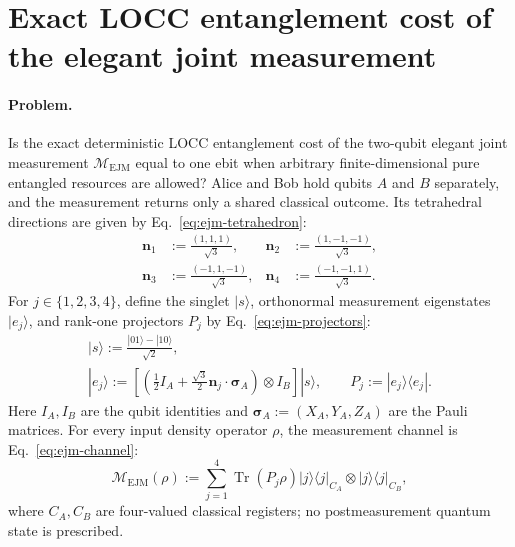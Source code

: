 \section{Exact LOCC entanglement cost of the elegant joint measurement}
\label{sec:op_d40d1f65b5aaaefd}

\paragraph{Problem.}
Is the exact deterministic LOCC entanglement cost of the two-qubit elegant joint measurement $\mathcal M_{\mathrm{EJM}}$ equal to one ebit when arbitrary finite-dimensional pure entangled resources are allowed? Alice and Bob hold qubits $A$ and $B$ separately, and the measurement returns only a shared classical outcome. Its tetrahedral directions are given by Eq.~\eqref{eq:ejm-tetrahedron}:
\begin{equation}
\begin{aligned}
\mathbf n_1&:=\frac{(1,1,1)}{\sqrt3},&
\mathbf n_2&:=\frac{(1,-1,-1)}{\sqrt3},\\
\mathbf n_3&:=\frac{(-1,1,-1)}{\sqrt3},&
\mathbf n_4&:=\frac{(-1,-1,1)}{\sqrt3}.
\end{aligned}
\label{eq:ejm-tetrahedron}
\end{equation}
For $j\in\{1,2,3,4\}$, define the singlet $|s\rangle$, orthonormal measurement eigenstates $|e_j\rangle$, and rank-one projectors $P_j$ by Eq.~\eqref{eq:ejm-projectors}:
\begin{equation}
\begin{gathered}
|s\rangle:=\frac{|01\rangle-|10\rangle}{\sqrt2},\\
|e_j\rangle:=\left[\left(\frac12 I_A+\frac{\sqrt3}{2}\mathbf n_j\cdot\boldsymbol\sigma_A\right)\otimes I_B\right]|s\rangle,
\qquad P_j:=|e_j\rangle\langle e_j|.
\end{gathered}
\label{eq:ejm-projectors}
\end{equation}
Here $I_A,I_B$ are the qubit identities and $\boldsymbol\sigma_A:=(X_A,Y_A,Z_A)$ are the Pauli matrices. For every input density operator $\rho$, the measurement channel is Eq.~\eqref{eq:ejm-channel}:
\begin{equation}
\mathcal M_{\mathrm{EJM}}(\rho):=\sum_{j=1}^4\operatorname{Tr}(P_j\rho)
|j\rangle\langle j|_{C_A}\otimes|j\rangle\langle j|_{C_B},
\label{eq:ejm-channel}
\end{equation}
where $C_A,C_B$ are four-valued classical registers; no postmeasurement quantum state is prescribed.

